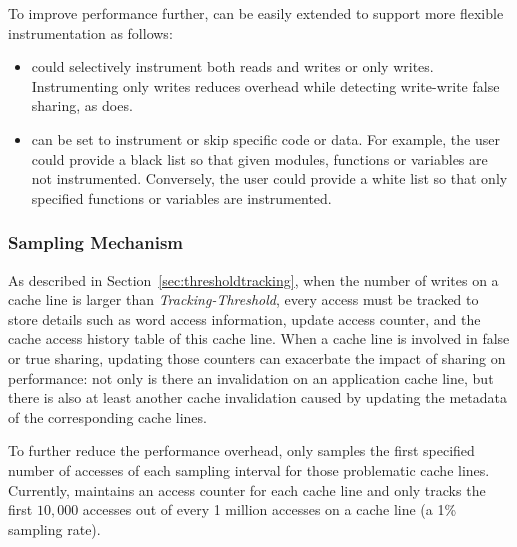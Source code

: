 To improve performance further,
\Predator{} can be easily extended to support more flexible instrumentation as follows:
\begin{itemize}
\item
\Predator{} could selectively instrument both reads and writes or only writes.
Instrumenting only writes reduces overhead while detecting write-write false sharing, 
as \Sheriff{} does. 
\item
\Predator{} can be set to instrument or skip specific code or data. 
For example, the user could provide a black list so that given modules,
functions or variables are not instrumented. 
Conversely, the user could provide a white list so that only specified functions or variables are instrumented. 
\end{itemize}

\subsubsection{Sampling Mechanism}
\label{sec:sample}
As described in Section~\ref{sec:thresholdtracking}, when the number of
writes on a cache line is larger than {\it Tracking-Threshold}, every
access must be tracked to store details such as word access
information, update access counter, and the cache access history table
of this cache line.  When a cache line is involved in false or true
sharing, updating those counters can exacerbate the impact of sharing
on performance: not only is there an invalidation on an application
cache line, but there is also at least another cache invalidation
caused by updating the metadata of the corresponding cache lines.

To further reduce the performance overhead, \Predator{} only samples the first specified
number of accesses of each sampling interval for those problematic cache lines. 
Currently, \Predator{} maintains an access counter for each cache line
and only tracks the first $10,000$ accesses out of every 1 million
accesses on a cache line (a 1\% sampling rate).

